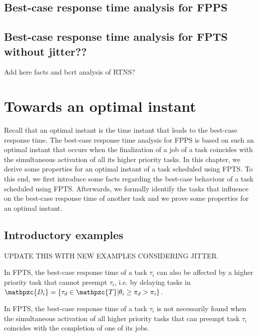 \subsection{Best-case response time analysis for FPPS}

\subsection{Best-case response time analysis for FPTS without jitter??}
Add here facts and bcrt analysis of RTNS?

\section{Towards an optimal instant}
Recall that an optimal instant is the time instant that leads to the best-case response time. The best-case response time analysis for FPPS is based on such an optimal instant that occurs when the finalization of a job of a task coincides with the simultaneous activation of all its higher priority tasks. In this chapter, we derive some properties for an optimal instant of a task scheduled using FPTS. To this end, we first introduce some facts regarding the best-case behaviour of a task scheduled using FPTS. Afterwards, we formally identify the tasks that influence on the best-case response time of another task and we prove some properties for an optimal instant.

\subsection{Introductory examples} \label{sec:intro_examples}

UPDATE THIS WITH NEW EXAMPLES CONSIDERING JITTER.

\begin{fact} \label{fct:delaying_tasks}
	In FPTS, the best-case response time of a task $\tau_i$ can also be affected by a higher priority task that cannot preempt $\tau_i$, i.e. by delaying tasks in $\mathpzc{D_i}=\{\tau_d \in \mathpzc{T}|\theta_i \geq \pi_d > \pi_i\}$.
\end{fact}

\begin{fact}\label{fct:realese_preempt_tasks}
	In FPTS, the best-case response time of a task $\tau_i$ is not necessarily found when the simultaneous activation of all higher priority tasks that can preempt task $\tau_i$ coincides with the completion of one of its jobs.
\end{fact}


